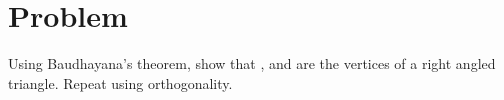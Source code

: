 \documentclass[journal,12pt,twocolumn]{IEEEtran}
\begin{document}
\section{Problem}
Using Baudhayana's theorem, show that ,  and  are the vertices of a right angled triangle. Repeat using orthogonality.  
\end{document}

